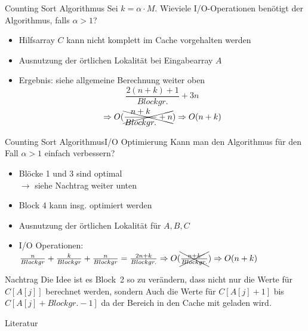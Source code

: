 \documentclass{beamer}
\def \korrekturfarbe {blue}
\begin{document}
\begin{frame}{Counting Sort Algorithmus}
  Sei $k = \alpha \cdot M$. Wieviele I/O-Operationen benötigt der Algorithmus, falls $\alpha > 1$?
  \begin{itemize}
    \item Hilfsarray $C$ kann nicht komplett im Cache vorgehalten werden
    \item Ausnutzung der örtlichen Lokalität bei Eingabearray $A$
    \item Ergebnis: siehe allgemeine Berechnung weiter oben
    \begin{equation*}
    \frac{2(n+k)+1}{Blockgr.}+3n
    \end{equation*}
    \begin{equation*}
    \Rightarrow O(\xcancel{\frac{n+k}{Blockgr.}+n}) \Rightarrow O(n + k)
    \end{equation*}
  \end{itemize}
\end{frame}

\begin{frame}[fragile]{Counting Sort Algorithmus}{I/O Optimierung}
  Kann man den Algorithmus für den Fall $\alpha > 1$ einfach verbessern?
  \begin{itemize}
    \item<1-> Blöcke  1 und 3 sind optimal \\
    {\color{\korrekturfarbe} $\rightarrow$ siehe Nachtrag weiter unten}
    \item<1-> Block 4 kann insg. optimiert werden
    \item<3> Ausnutzung der örtlichen Lokalität für $A, B, C$
    \item<3> I/O Operationen: $\frac{n}{Blockgr} + \frac{k}{Blockgr} + \frac{n}{Blockgr} = \frac{2n+k}{Blockgr.} \Rightarrow O(\xcancel{\frac{n+k}{Blockgr.}}) \Rightarrow O(n + k)$
  \end{itemize}

  \begin{semiverbatim}
  \end{semiverbatim}
\end{frame}

\begin{frame}{Nachtrag}
  Die Idee ist es Block~2 so zu verändern, dass nicht nur die Werte für $C[A[j]]$ berechnet werden, sondern Auch die Werte für $C[A[j] + 1]$ bis $C[A[j] + Blockgr. -1]$ da der Bereich in den Cache mit geladen wird.
\end{frame}

\begin{frame}{Literatur}
  
  
\end{frame}
\end{document}
